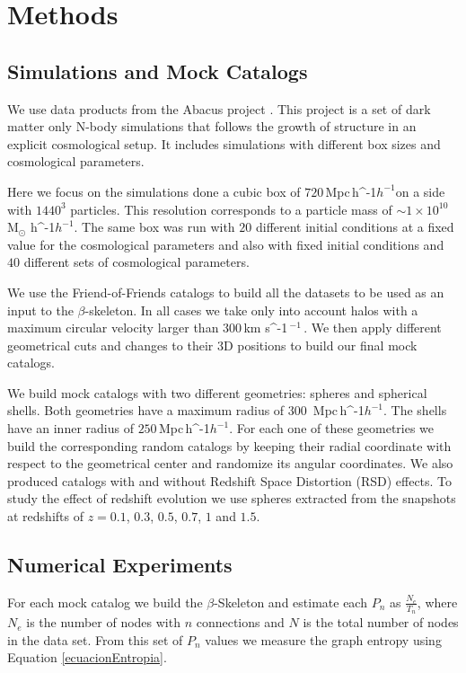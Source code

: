\documentclass[fleqn,usenatbib]{mnras}
\newcommand{\Msunh}{\,{\rm M}$_{\odot}$\,\,\ifmmode h^{-1}\else $h^{-1}$\fi}
\newcommand{\kms}{\,{\rm km s}\ifmmode ^{-1}\,\else $^{-1}$\,\fi}
\newcommand{\Mpch}{\,{\rm Mpc}\,\ifmmode h^{-1}\else $h^{-1}$\fi}
\begin{document}
\section{Methods}


\subsection{Simulations and Mock Catalogs}

We use data products from the Abacus project \citep{abacus}.
This project is a set of dark matter only N-body simulations that follows
the growth of structure in an explicit cosmological setup.
It includes simulations with different box sizes and cosmological parameters.

Here we focus on the simulations done a cubic box of $720$\Mpch on a side
with $1440^3$ particles. 
This resolution corresponds to a particle mass of $\sim1\times10^{10}$ \Msunh.
The same box was run with $20$ different initial conditions at a fixed value for
the cosmological parameters and also with fixed initial conditions and $40$ different
sets of cosmological parameters.

We use the Friend-of-Friends catalogs to build all the datasets to be used
as an input to the $\beta$-skeleton. In all cases we take only into account halos
with a maximum circular velocity larger than $300$\kms. 
We then apply different geometrical cuts and changes to their 3D positions to build 
our final mock catalogs.

We build mock catalogs with two different geometries: spheres and spherical shells.
Both geometries have a maximum radius of $300$ \Mpch.
The shells have an inner radius of $250$\Mpch.
For each one of these geometries we build the corresponding random catalogs
by keeping their radial coordinate with respect to the geometrical center and 
randomize its angular coordinates.
We also produced catalogs with and without Redshift Space Distortion (RSD) effects. 
To study the effect of redshift evolution we use spheres extracted from
the snapshots at redshifts of $z=0.1$, $0.3$, $0.5$, $0.7$, $1$ and $1.5$.



\subsection{Numerical Experiments}

For each mock catalog we build the $\beta$-Skeleton and estimate each $P_n$ as  $\frac{N_e}{T_n}$, where $N_e$ is the number of nodes with $n$ connections and $N$ is the
total number of nodes in the data set.
From this set of $P_n$ values we measure the graph entropy using Equation \ref{ecuacionEntropia}.
\end{document}
